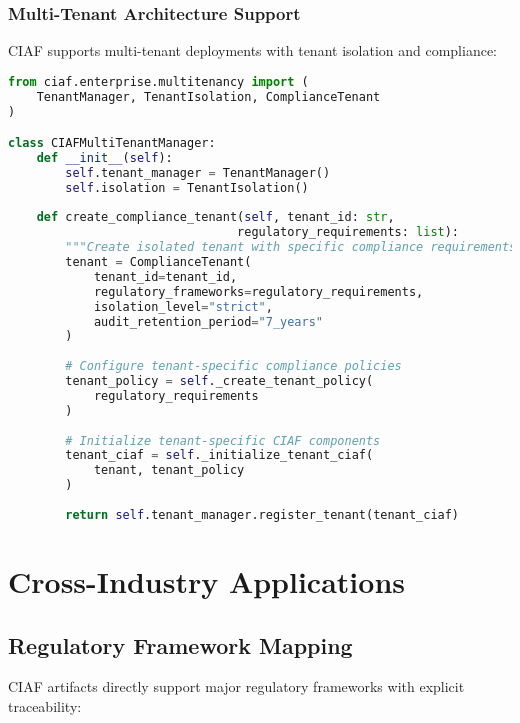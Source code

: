 \documentclass[12pt,a4paper]{article}
\begin{document}
\subsubsection{Multi-Tenant Architecture Support}

CIAF supports multi-tenant deployments with tenant isolation and compliance:

\begin{lstlisting}[language=Python, caption=Multi-Tenant Architecture]
from ciaf.enterprise.multitenancy import (
    TenantManager, TenantIsolation, ComplianceTenant
)

class CIAFMultiTenantManager:
    def __init__(self):
        self.tenant_manager = TenantManager()
        self.isolation = TenantIsolation()
    
    def create_compliance_tenant(self, tenant_id: str, 
                                regulatory_requirements: list):
        """Create isolated tenant with specific compliance requirements."""
        tenant = ComplianceTenant(
            tenant_id=tenant_id,
            regulatory_frameworks=regulatory_requirements,
            isolation_level="strict",
            audit_retention_period="7_years"
        )
        
        # Configure tenant-specific compliance policies
        tenant_policy = self._create_tenant_policy(
            regulatory_requirements
        )
        
        # Initialize tenant-specific CIAF components
        tenant_ciaf = self._initialize_tenant_ciaf(
            tenant, tenant_policy
        )
        
        return self.tenant_manager.register_tenant(tenant_ciaf)
\end{lstlisting}

\section{Cross-Industry Applications}

\subsection{Regulatory Framework Mapping}

CIAF artifacts directly support major regulatory frameworks with explicit traceability:
\end{document}
